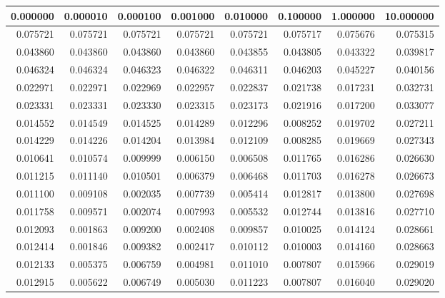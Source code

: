 \begin{tabular}{rrrrrrrr}
\toprule
0.000000 & 0.000010 & 0.000100 & 0.001000 & 0.010000 & 0.100000 & 1.000000 & 10.000000 \\
\midrule
0.075721 & 0.075721 & 0.075721 & 0.075721 & 0.075721 & 0.075717 & 0.075676 & 0.075315 \\
0.043860 & 0.043860 & 0.043860 & 0.043860 & 0.043855 & 0.043805 & 0.043322 & 0.039817 \\
0.046324 & 0.046324 & 0.046323 & 0.046322 & 0.046311 & 0.046203 & 0.045227 & 0.040156 \\
0.022971 & 0.022971 & 0.022969 & 0.022957 & 0.022837 & 0.021738 & 0.017231 & 0.032731 \\
0.023331 & 0.023331 & 0.023330 & 0.023315 & 0.023173 & 0.021916 & 0.017200 & 0.033077 \\
0.014552 & 0.014549 & 0.014525 & 0.014289 & 0.012296 & 0.008252 & 0.019702 & 0.027211 \\
0.014229 & 0.014226 & 0.014204 & 0.013984 & 0.012109 & 0.008285 & 0.019669 & 0.027343 \\
0.010641 & 0.010574 & 0.009999 & 0.006150 & 0.006508 & 0.011765 & 0.016286 & 0.026630 \\
0.011215 & 0.011140 & 0.010501 & 0.006379 & 0.006468 & 0.011703 & 0.016278 & 0.026673 \\
0.011100 & 0.009108 & 0.002035 & 0.007739 & 0.005414 & 0.012817 & 0.013800 & 0.027698 \\
0.011758 & 0.009571 & 0.002074 & 0.007993 & 0.005532 & 0.012744 & 0.013816 & 0.027710 \\
0.012093 & 0.001863 & 0.009200 & 0.002408 & 0.009857 & 0.010025 & 0.014124 & 0.028661 \\
0.012414 & 0.001846 & 0.009382 & 0.002417 & 0.010112 & 0.010003 & 0.014160 & 0.028663 \\
0.012133 & 0.005375 & 0.006759 & 0.004981 & 0.011010 & 0.007807 & 0.015966 & 0.029019 \\
0.012915 & 0.005622 & 0.006749 & 0.005030 & 0.011223 & 0.007807 & 0.016040 & 0.029020 \\
\bottomrule
\end{tabular}
